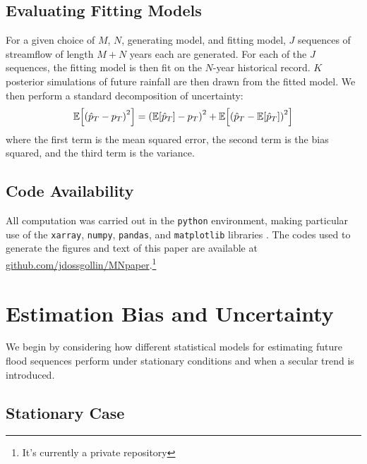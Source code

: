 \documentclass[12pt]{article}
\begin{document}
\subsection{Evaluating Fitting Models}

For a given choice of $M$, $N$, generating model, and fitting model, \(J\) sequences of streamflow of length \(M+N\) years each are generated.
For each of the \(J\) sequences, the fitting model is then fit on the $N$-year historical record.
\(K\) posterior simulations of future rainfall are then drawn from the fitted model.
We then perform a standard decomposition of uncertainty:
\begin{equation}
  \mathbb{E} \qty[ \qty( \hat{p}_T - p_T )^2 ] = \qty( \mathbb{E} \qty[ \hat{p}_T ] - p_T )^2 + \mathbb{E} \qty[ \qty( \hat{p}_T - \mathbb{E} \qty[ \hat{p}_T ] )^2]
\end{equation}
where the first term is the mean squared error, the second term is the bias squared, and the third term is the variance.

\subsection{Code Availability}

All computation was carried out in the \texttt{python} environment, making particular use of the \texttt{xarray}, \texttt{numpy}, \texttt{pandas}, and \texttt{matplotlib} libraries \citep{Hoyer2017,vanderWalt2011,McKinney2010,Hunter2007}.
The codes used to generate the figures and text of this paper are available at \url{github.com/jdossgollin/MNpaper}.\footnote{It's currently a private repository}


\section{Estimation Bias and Uncertainty}\label{sec:results}

We begin by considering how different statistical models for estimating future flood sequences perform under stationary conditions and when a secular trend is introduced.

\subsection{Stationary Case}\label{sec:results-stationary}
\end{document}
